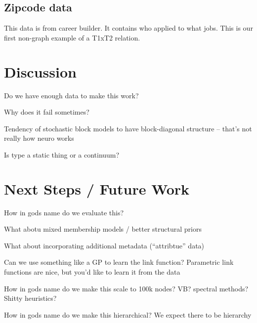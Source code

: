 \documentclass{article}
\begin{document}
\subsection{Zipcode data}

This data is from career builder. It contains who applied to what
jobs. This is our first non-graph example of a T1xT2 relation.


\section{Discussion}
Do we have enough data to make this work? 

Why does it fail sometimes? 

Tendency of stochastic block models to have block-diagonal structure -- that's not really how neuro works

Is type a static thing or a continuum? 


\section{Next Steps / Future Work}
How in gods name do we evaluate this? 

What abotu mixed membership models / better structural priors

What about incorporating additional metadata (``attribtue'' data)

Can we use something like a GP to learn the link function? 
Parametric link functions are nice, but you'd like to learn it from the data

How in gods name do we make this scale to 100k nodes? 
VB? spectral methods? Shitty heuristics? 

How in gods name do we make this hierarchical? 
We expect there to be hierarchy 

\printbibliography
\end{document}
